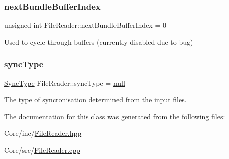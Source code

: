 \subsubsection{\texorpdfstring{next\+Bundle\+Buffer\+Index}{nextBundleBufferIndex}}
{\footnotesize\ttfamily unsigned int File\+Reader\+::next\+Bundle\+Buffer\+Index = 0\hspace{0.3cm}{\ttfamily [private]}}



Used to cycle through buffers (currently disabled due to bug) 

\mbox{\label{class_file_reader_aace1373e21949925dbfe568e4c8d7f56}} 
\subsubsection{\texorpdfstring{sync\+Type}{syncType}}
{\footnotesize\ttfamily \hyperlink{class_file_reader_aa591258dbf3366cfd674e84a1f2f6531}{Sync\+Type} File\+Reader\+::sync\+Type = \hyperlink{class_file_reader_aa591258dbf3366cfd674e84a1f2f6531a3d35358ce57d04ec9c0e07af48692c88}{null}\hspace{0.3cm}{\ttfamily [private]}}



The type of syncronisation determined from the input files. 



The documentation for this class was generated from the following files\+:\begin{DoxyCompactItemize}
\item 
Core/inc/\hyperlink{_file_reader_8hpp}{File\+Reader.\+hpp}\item 
Core/src/\hyperlink{_file_reader_8cpp}{File\+Reader.\+cpp}\end{DoxyCompactItemize}
